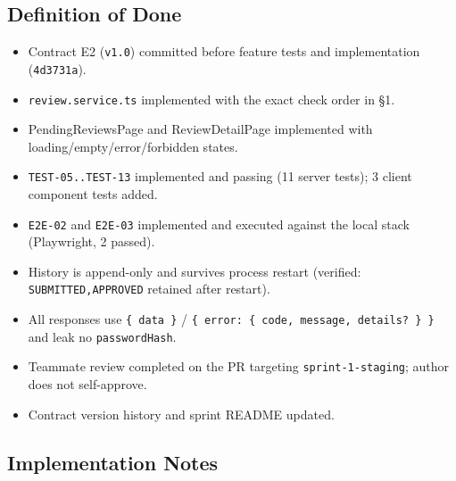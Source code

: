 \documentclass[11pt,a4paper]{article}
\begin{document}
\subsection{Definition of Done}

\begin{itemize}[leftmargin=*,itemsep=2pt,topsep=2pt]
  \item [x] Contract E2 (\texttt{v1.0}) committed before feature tests and implementation (\texttt{4d3731a}).
  \item [x] \texttt{review.service.ts} implemented with the exact check order in §1.
  \item [x] PendingReviewsPage and ReviewDetailPage implemented with loading/empty/error/forbidden states.
  \item [x] \texttt{TEST-05..TEST-13} implemented and passing (11 server tests); 3 client component tests added.
  \item [x] \texttt{E2E-02} and \texttt{E2E-03} implemented and executed against the local stack (Playwright, 2 passed).
  \item [x] History is append-only and survives process restart (verified: \texttt{SUBMITTED,APPROVED} retained after restart).
  \item [x] All responses use \texttt{\{ data \}} / \texttt{\{ error: \{ code, message, details? \} \}} and leak no \texttt{passwordHash}.
  \item [ ] Teammate review completed on the PR targeting \texttt{sprint-1-staging}; author does not self-approve.
  \item [x] Contract version history and sprint README updated.
\end{itemize}

\subsection{Implementation Notes}
\end{document}
